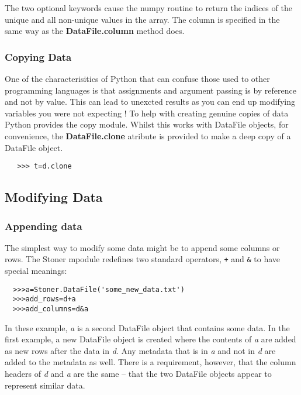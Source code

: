 \documentclass[a4paper,11pt]{scrartcl}
\begin{document}
The two optional keywords cause the numpy routine to return the
indices of the unique and all non-unique values in the array. The
column is specified in the same way as the \textbf{DataFile.column}
method does.

\subsubsection{Copying Data}

One of the characterisitics of Python that can confuse those used to other
programming languages is that assignments and argument passing is by reference
and not by value. This can lead to unexcted results as you can end up modifying variables you were not expecting ! To help with creating genuine copies of data Python provides the copy module. Whilst this works with DataFile objects, for convenience, the \textbf{DataFile.clone} atribute is provided to make a deep copy of a DataFile object.


\begin{verbatim}
   >>> t=d.clone
\end{verbatim}


\subsection{Modifying Data}

\subsubsection{Appending data}

The simplest way to modify some data might be to append some columns or rows.
The Stoner mpodule redefines two standard operators, \verb:+: and \verb:&: to
have special meanings:
\begin{verbatim}
  >>>a=Stoner.DataFile('some_new_data.txt')
  >>>add_rows=d+a
  >>>add_columns=d&a
\end{verbatim}
In these example, \textit{a} is a second DataFile object that contains some
data. In the first example, a new DataFile object is created where the contents
of \textit{a} are added as new rows after the data in \textit{d}. Any metadata
that is in \textit{a} and not in \textit{d} are added to the metadata as well.
There is a requirement, however, that the column headers of \textit{d} and
\textit{a} are the same -- \ie that the two DataFile objects appear to represent
similar data.
\end{document}
